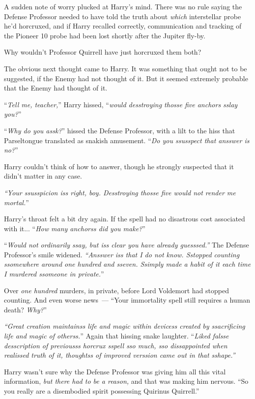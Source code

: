 A sudden note of worry plucked at Harry's mind. There was no rule saying the Defense Professor needed to have told the truth about \emph{which} interstellar probe he'd horcruxed, and if Harry recalled correctly, communication and tracking of the Pioneer 10 probe had been lost shortly after the Jupiter fly-by.

Why wouldn't Professor Quirrell have just horcruxed them both?

The obvious next thought came to Harry. It was something that ought not to be suggested, if the Enemy had not thought of it. But it seemed extremely probable that the Enemy had thought of it.

``\emph{Tell me, teacher,}'' Harry hissed, ``\emph{would desstroying thosse five anchors sslay you?}''

``\emph{Why do you assk?}'' hissed the Defense Professor, with a lilt to the hiss that Parseltongue translated as snakish amusement. ``\emph{Do you ssusspect that ansswer is no?}''

Harry couldn't think of how to answer, though he strongly suspected that it didn't matter in any case.

\emph{``Your ssusspicion iss right, boy. Desstroying thosse five would not render me mortal.}''

Harry's throat felt a bit dry again. If the spell had no disastrous cost associated with it... ``\emph{How many anchorss did you make?}''

``\emph{Would not ordinarily ssay, but iss clear you have already guesssed.''} The Defense Professor's smile widened. \emph{``Ansswer iss that I do not know. Sstopped counting ssomewhere around one hundred and sseven. Ssimply made a habit of it each time I murdered ssomeone in private.}''

Over \emph{one hundred} murders, in private, before Lord Voldemort had stopped counting. And even worse news~--- ``Your immortality spell still requires a human death? \emph{Why?}''

\emph{``Great creation maintainss life and magic within devicess created by ssacrificing life and magic of otherss.}'' Again that hissing snake laughter. ``\emph{Liked falsse desscription of previousss horcrux sspell sso much, sso dissappointed when realissed truth of it, thoughtss of improved verssion came out in that sshape.''}

Harry wasn't sure why the Defense Professor was giving him all this vital information, \emph{but there had to be a reason,} and that was making him nervous. ``So you really are a disembodied spirit possessing Quirinus Quirrell.''

